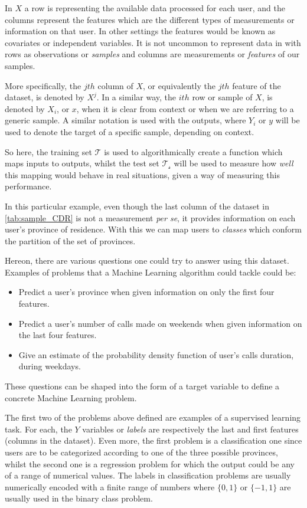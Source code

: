 In $X$ a row is representing the available data processed for each user, and the columns represent the features which are the different types of measurements or information on that user.
In other settings the features would be known as covariates or independent variables.
It is not uncommon to represent data in with rows as observations or \textit{samples} and columns are measurements or \textit{features} of our samples.

More specifically, the $jth$ column of $X$, or equivalently the $jth$ feature of the dataset, is denoted by $X^j$.
In a similar way, the $ith$ row or sample of $X$, is denoted by $X_i$, or $x$, when it is clear from context or when we are referring to a generic sample.
A similar notation is used with the outputs, where $Y_i$ or $y$ will be used to denote the target of a specific sample, depending on context.

So here, the training set $\mathcal{T}$ is used to algorithmically create a function which maps inputs to outputs,  whilst the test set $\mathcal{T_s}$ will be used to measure how \textit{well} this mapping would behave in real situations, given a way of measuring this performance.

In this particular example, even though the last column of the dataset in \cref{tab:sample_CDR} is not a measurement \textit{per se}, it provides information on each user's province of residence.
With this we can map users to \textit{classes} which conform the partition of the set of provinces.

Hereon, there are various questions one could try to answer using this dataset.
Examples of problems that a Machine Learning algorithm could tackle could be:
\begin{itemize}
\item Predict a user's province when given information on only the first four features.
\item Predict a user's number of calls made on weekends when given information on the last four features.
\item Give an estimate of the probability density function of user's calls duration, during weekdays.
\end{itemize}

These questions can be shaped into the form of a target variable to define a concrete Machine Learning problem.

The first two of the problems above defined are examples of a supervised learning task.
For each, the $Y$ variables or \textit{labels} are respectively the last and first features (columns in the dataset).
Even more, the first problem is a classification one since users are to be categorized according to one of the three possible provinces, whilst the second one is a regression problem for which the output could be any of a range of numerical values.
The labels in classification problems are usually numerically encoded with a finite range of numbers where $\{0,1\}$ or $\{-1,1\}$ are usually used in the binary class problem.

